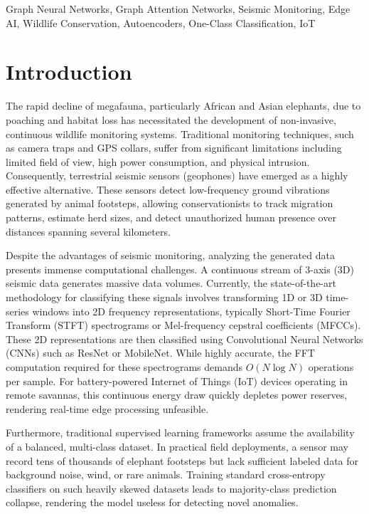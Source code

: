\documentclass[conference, a4paper]{IEEEtran}
\begin{document}
\begin{IEEEkeywords}
Graph Neural Networks, Graph Attention Networks, Seismic Monitoring, Edge AI, Wildlife Conservation, Autoencoders, One-Class Classification, IoT
\end{IEEEkeywords}

\section{Introduction}
The rapid decline of megafauna, particularly African and Asian elephants, due to poaching and habitat loss has necessitated the development of non-invasive, continuous wildlife monitoring systems. Traditional monitoring techniques, such as camera traps and GPS collars, suffer from significant limitations including limited field of view, high power consumption, and physical intrusion. Consequently, terrestrial seismic sensors (geophones) have emerged as a highly effective alternative. These sensors detect low-frequency ground vibrations generated by animal footsteps, allowing conservationists to track migration patterns, estimate herd sizes, and detect unauthorized human presence over distances spanning several kilometers.

Despite the advantages of seismic monitoring, analyzing the generated data presents immense computational challenges. A continuous stream of 3-axis (3D) seismic data generates massive data volumes. Currently, the state-of-the-art methodology for classifying these signals involves transforming 1D or 3D time-series windows into 2D frequency representations, typically Short-Time Fourier Transform (STFT) spectrograms or Mel-frequency cepstral coefficients (MFCCs). These 2D representations are then classified using Convolutional Neural Networks (CNNs) such as ResNet or MobileNet. While highly accurate, the FFT computation required for these spectrograms demands $O(N \log N)$ operations per sample. For battery-powered Internet of Things (IoT) devices operating in remote savannas, this continuous energy draw quickly depletes power reserves, rendering real-time edge processing unfeasible.

Furthermore, traditional supervised learning frameworks assume the availability of a balanced, multi-class dataset. In practical field deployments, a sensor may record tens of thousands of elephant footsteps but lack sufficient labeled data for background noise, wind, or rare animals. Training standard cross-entropy classifiers on such heavily skewed datasets leads to majority-class prediction collapse, rendering the model useless for detecting novel anomalies.
\end{document}
